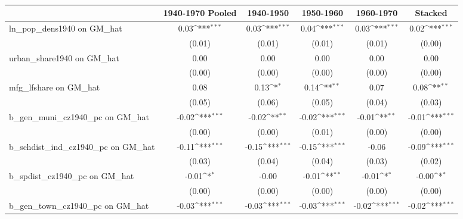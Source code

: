 \begin{table}[htbp]\centering
\def\sym#1{\ifmmode^{#1}\else\(^{#1}\)\fi}
\caption{}
\begin{tabular}{l*{5}{c}}
\toprule
                &\multicolumn{1}{c}{1940-1970 Pooled}&\multicolumn{1}{c}{1940-1950}&\multicolumn{1}{c}{1950-1960}&\multicolumn{1}{c}{1960-1970}&\multicolumn{1}{c}{Stacked}\\
\midrule
ln\_pop\_dens1940 on GM\_hat&     0.03\sym{***}&     0.03\sym{***}&     0.04\sym{***}&     0.03\sym{***}&     0.02\sym{***}\\
                &   (0.01)         &   (0.01)         &   (0.01)         &   (0.01)         &   (0.00)         \\
\addlinespace
urban\_share1940 on GM\_hat&     0.00         &     0.00         &     0.00         &     0.00         &     0.00         \\
                &   (0.00)         &   (0.00)         &   (0.00)         &   (0.00)         &   (0.00)         \\
\addlinespace
mfg\_lfshare on GM\_hat&     0.08         &     0.13\sym{*}  &     0.14\sym{**} &     0.07         &     0.08\sym{**} \\
                &   (0.05)         &   (0.06)         &   (0.05)         &   (0.04)         &   (0.03)         \\
\addlinespace
b\_gen\_muni\_cz1940\_pc on GM\_hat&    -0.02\sym{***}&    -0.02\sym{**} &    -0.02\sym{***}&    -0.01\sym{**} &    -0.01\sym{***}\\
                &   (0.00)         &   (0.00)         &   (0.01)         &   (0.00)         &   (0.00)         \\
\addlinespace
b\_schdist\_ind\_cz1940\_pc on GM\_hat&    -0.11\sym{***}&    -0.15\sym{***}&    -0.15\sym{***}&    -0.06         &    -0.09\sym{***}\\
                &   (0.03)         &   (0.04)         &   (0.04)         &   (0.03)         &   (0.02)         \\
\addlinespace
b\_spdist\_cz1940\_pc on GM\_hat&    -0.01\sym{*}  &    -0.00         &    -0.01\sym{**} &    -0.01\sym{*}  &    -0.00\sym{*}  \\
                &   (0.00)         &   (0.00)         &   (0.00)         &   (0.00)         &   (0.00)         \\
\addlinespace
b\_gen\_town\_cz1940\_pc on GM\_hat&    -0.03\sym{***}&    -0.03\sym{***}&    -0.03\sym{***}&    -0.02\sym{***}&    -0.02\sym{***}\\

\end{tabular}
\end{table}
